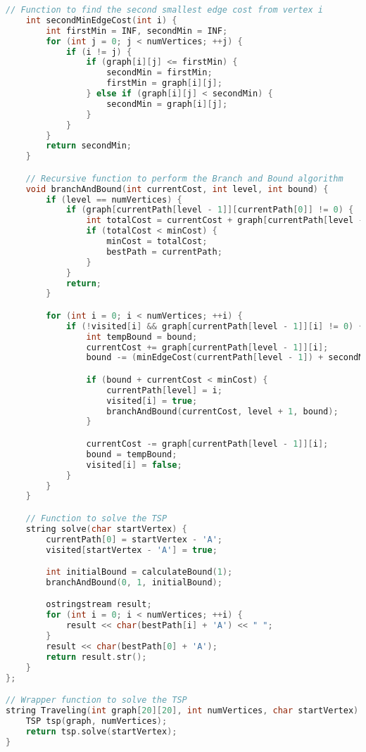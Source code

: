 \documentclass[a4paper]{article}
\begin{document}
\begin{lstlisting}[language=C++, caption={Traveling Salesman Problem Solver - C++ Code with Comments}, style=cppstyle]
    // Function to find the second smallest edge cost from vertex i
    int secondMinEdgeCost(int i) {
        int firstMin = INF, secondMin = INF;
        for (int j = 0; j < numVertices; ++j) {
            if (i != j) {
                if (graph[i][j] <= firstMin) {
                    secondMin = firstMin;
                    firstMin = graph[i][j];
                } else if (graph[i][j] < secondMin) {
                    secondMin = graph[i][j];
                }
            }
        }
        return secondMin;
    }

    // Recursive function to perform the Branch and Bound algorithm
    void branchAndBound(int currentCost, int level, int bound) {
        if (level == numVertices) {
            if (graph[currentPath[level - 1]][currentPath[0]] != 0) {
                int totalCost = currentCost + graph[currentPath[level - 1]][currentPath[0]];
                if (totalCost < minCost) {
                    minCost = totalCost;
                    bestPath = currentPath;
                }
            }
            return;
        }

        for (int i = 0; i < numVertices; ++i) {
            if (!visited[i] && graph[currentPath[level - 1]][i] != 0) {
                int tempBound = bound;
                currentCost += graph[currentPath[level - 1]][i];
                bound -= (minEdgeCost(currentPath[level - 1]) + secondMinEdgeCost(i)) / 2;

                if (bound + currentCost < minCost) {
                    currentPath[level] = i;
                    visited[i] = true;
                    branchAndBound(currentCost, level + 1, bound);
                }

                currentCost -= graph[currentPath[level - 1]][i];
                bound = tempBound;
                visited[i] = false;
            }
        }
    }

    // Function to solve the TSP
    string solve(char startVertex) {
        currentPath[0] = startVertex - 'A';
        visited[startVertex - 'A'] = true;

        int initialBound = calculateBound(1);
        branchAndBound(0, 1, initialBound);

        ostringstream result;
        for (int i = 0; i < numVertices; ++i) {
            result << char(bestPath[i] + 'A') << " ";
        }
        result << char(bestPath[0] + 'A');
        return result.str();
    }
};

// Wrapper function to solve the TSP
string Traveling(int graph[20][20], int numVertices, char startVertex) {
    TSP tsp(graph, numVertices);
    return tsp.solve(startVertex);
}
\end{lstlisting}
\end{document}
